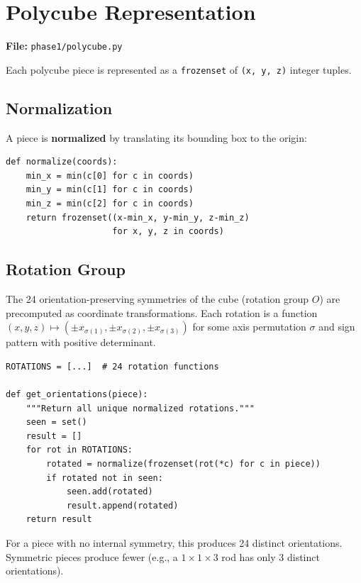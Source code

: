 \documentclass[11pt]{article}
\begin{document}
\section{Polycube Representation}

\textbf{File:} \texttt{phase1/polycube.py}

Each polycube piece is represented as a \texttt{frozenset} of \texttt{(x, y, z)} integer tuples.

\subsection{Normalization}

A piece is \textbf{normalized} by translating its bounding box to the origin:

\begin{lstlisting}
def normalize(coords):
    min_x = min(c[0] for c in coords)
    min_y = min(c[1] for c in coords)
    min_z = min(c[2] for c in coords)
    return frozenset((x-min_x, y-min_y, z-min_z)
                     for x, y, z in coords)
\end{lstlisting}

\subsection{Rotation Group}

The 24 orientation-preserving symmetries of the cube (rotation group $O$) are precomputed as coordinate transformations. Each rotation is a function $(x, y, z) \mapsto (\pm x_{\sigma(1)}, \pm x_{\sigma(2)}, \pm x_{\sigma(3)})$ for some axis permutation $\sigma$ and sign pattern with positive determinant.

\begin{lstlisting}
ROTATIONS = [...]  # 24 rotation functions

def get_orientations(piece):
    """Return all unique normalized rotations."""
    seen = set()
    result = []
    for rot in ROTATIONS:
        rotated = normalize(frozenset(rot(*c) for c in piece))
        if rotated not in seen:
            seen.add(rotated)
            result.append(rotated)
    return result
\end{lstlisting}

For a piece with no internal symmetry, this produces 24 distinct orientations. Symmetric pieces produce fewer (e.g., a $1 \times 1 \times 3$ rod has only 3 distinct orientations).
\end{document}
